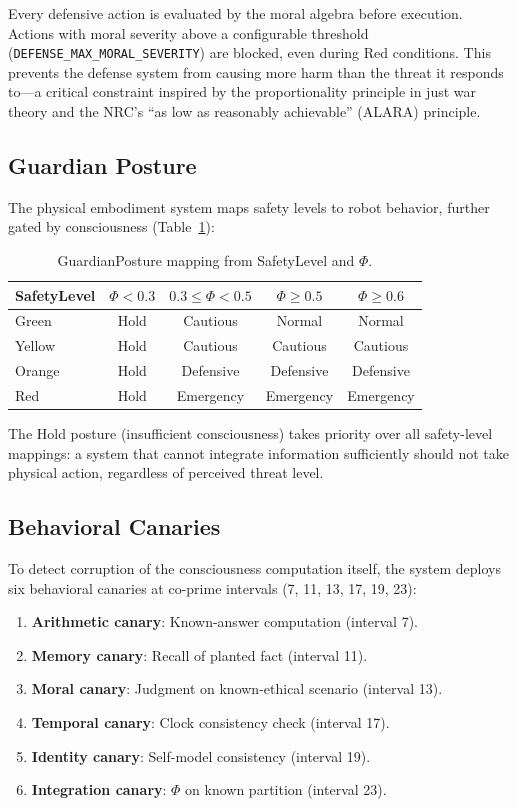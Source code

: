 \documentclass[11pt,a4paper]{article}
\begin{document}
Every defensive action is evaluated by the moral algebra before execution. Actions with moral severity above a configurable threshold (\texttt{DEFENSE\_MAX\_MORAL\_SEVERITY}) are blocked, even during Red conditions. This prevents the defense system from causing more harm than the threat it responds to---a critical constraint inspired by the proportionality principle in just war theory and the NRC's ``as low as reasonably achievable'' (ALARA) principle.

\subsection{Guardian Posture}

The physical embodiment system maps safety levels to robot behavior, further gated by consciousness (Table~\ref{tab:guardian}):

\begin{table}[h]
\centering
\caption{GuardianPosture mapping from SafetyLevel and $\Phi$.}
\label{tab:guardian}
\begin{tabular}{lcccc}
\toprule
\textbf{SafetyLevel} & $\Phi < 0.3$ & $0.3 \leq \Phi < 0.5$ & $\Phi \geq 0.5$ & $\Phi \geq 0.6$ \\
\midrule
Green & Hold & Cautious & Normal & Normal \\
Yellow & Hold & Cautious & Cautious & Cautious \\
Orange & Hold & Defensive & Defensive & Defensive \\
Red & Hold & Emergency & Emergency & Emergency \\
\bottomrule
\end{tabular}
\end{table}

The Hold posture (insufficient consciousness) takes priority over all safety-level mappings: a system that cannot integrate information sufficiently should not take physical action, regardless of perceived threat level.

\subsection{Behavioral Canaries}

To detect corruption of the consciousness computation itself, the system deploys six behavioral canaries at co-prime intervals (7, 11, 13, 17, 19, 23):

\begin{enumerate}
  \item \textbf{Arithmetic canary}: Known-answer computation (interval 7).
  \item \textbf{Memory canary}: Recall of planted fact (interval 11).
  \item \textbf{Moral canary}: Judgment on known-ethical scenario (interval 13).
  \item \textbf{Temporal canary}: Clock consistency check (interval 17).
  \item \textbf{Identity canary}: Self-model consistency (interval 19).
  \item \textbf{Integration canary}: $\Phi$ on known partition (interval 23).
\end{enumerate}
\end{document}
